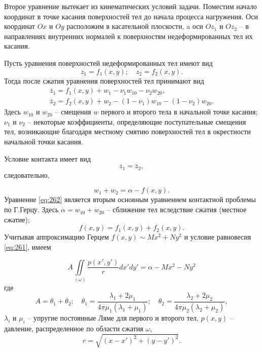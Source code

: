 \documentclass[specialist, subf, href, colorlinks=true, 14pt, final]{disser}
\theoremstyle{definition}
\begin{document}
Второе уравнение вытекает из кинематических условий задачи. Поместим начало координат в точке касания поверхностей тел до начала процесса нагружения. Оси координат $Ox$ и $Oy$ расположим в касательной плоскости, a оси $Oz_1$ и $Oz_2$ -- в направлениях внутренних нормалей к поверхностям недеформированных тел их касания.

Пусть уравнения поверхностей недеформированных тел имеют вид
\[
  z_{1} = f_{1}(x,y);\quad z_{2} = f_{2}(x,y).
\]
Тогда после сжатия уравнения поверхностей тел принимают вид
\[
  \begin{array}{l}
  \overline{z}_{1} = f_{1}(x,y) + w_{1} - \nu_{1}w_{10} - \nu_{2}w_{20},\\
  \overline{z}_{2} = f_{2}(x,y) + w_{2} - (1-\nu_{1})w_{10} - (1-\nu_{2})w_{20}.
  \end{array}
\]
Здесь $w_{10}$ и $w_{20}$ -- смещения $w$ первого и второго тела в начальной точке касания; $\nu_1$ и $\nu_2$ -- некоторые коэффициенты, определяющие поступательные смещения тел, возникающие благодаря местному смятию поверхностей тел в окрестности начальной точки касания.

Условие контакта имеет вид
\[ \overline{z}_1 = \overline{z}_2, \]
следовательно,
\addtocounter{equation}{1}
\begin{equation}\label{eq:262}
  w_{1} + w_{2} = \alpha - f(x,y).
  \tag{2}
\end{equation} 
Уравнение \eqref{eq:262} является вторым основным уравнением контактной проблемы по Г.Герцу. Здесь $\alpha = w_{10} + w_{20}$ -- сближение тел вследствие сжатия (местное сжатие);
\[
  f(x,y) = f_{1}(x,y) + f_{2}(x,y).
\]
Учитывая аппроксимацию Герцем $f(x,y) \sim Mx^{2} + Ny^{2}$ и условие равновесия \eqref{eq:261}, имеем
\addtocounter{equation}{1}
\begin{equation}\label{eq:263}
   A \iint\limits_{(\omega)} \frac{p(x',y')}{r} dx' dy' = \alpha - M x^2 - N y^2
  \tag{3}
\end{equation}
где
\[
  A = \theta_1 + \theta_2; \quad \theta_1 = \displaystyle \frac{\lambda_1 + 2\mu_1}{4 \pi \mu_1 (\lambda_1 + \mu_1)}; \quad \theta_2 = \displaystyle \frac{\lambda_2 + 2\mu_2}{4 \pi \mu_2 (\lambda_2 + \mu_2)},
\]
$\lambda_i$ и $\mu_i$ -- упругие постоянные Ляме для первого и второго тел, $p(x,y)$ -- давление, распределенное по области сжатия $\omega$,
\[
  r = \sqrt{(x-x')^{2} + (y-y')^{2}}.
\]
\end{document}
